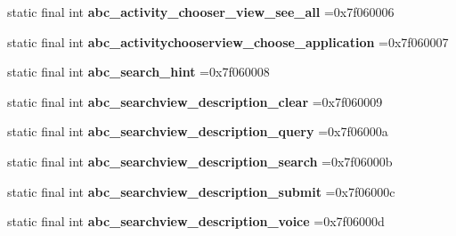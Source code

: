 \begin{DoxyCompactItemize}
\item 
\hypertarget{classcheck_1_1test_1_1_r_1_1string_a392b85ef23b31e97c14bfa4b84031797}{}static final int {\bfseries abc\+\_\+activity\+\_\+chooser\+\_\+view\+\_\+see\+\_\+all} =0x7f060006\label{classcheck_1_1test_1_1_r_1_1string_a392b85ef23b31e97c14bfa4b84031797}

\item 
\hypertarget{classcheck_1_1test_1_1_r_1_1string_a6532280df6ff470928259256084000d9}{}static final int {\bfseries abc\+\_\+activitychooserview\+\_\+choose\+\_\+application} =0x7f060007\label{classcheck_1_1test_1_1_r_1_1string_a6532280df6ff470928259256084000d9}

\item 
\hypertarget{classcheck_1_1test_1_1_r_1_1string_a2783cfe5ced23bd37469283b8fedf489}{}static final int {\bfseries abc\+\_\+search\+\_\+hint} =0x7f060008\label{classcheck_1_1test_1_1_r_1_1string_a2783cfe5ced23bd37469283b8fedf489}

\item 
\hypertarget{classcheck_1_1test_1_1_r_1_1string_ad0fbe4b6ffe3eda07d59655e137b35f9}{}static final int {\bfseries abc\+\_\+searchview\+\_\+description\+\_\+clear} =0x7f060009\label{classcheck_1_1test_1_1_r_1_1string_ad0fbe4b6ffe3eda07d59655e137b35f9}

\item 
\hypertarget{classcheck_1_1test_1_1_r_1_1string_a2135dfe78026bcfac02ae3b3fd41be39}{}static final int {\bfseries abc\+\_\+searchview\+\_\+description\+\_\+query} =0x7f06000a\label{classcheck_1_1test_1_1_r_1_1string_a2135dfe78026bcfac02ae3b3fd41be39}

\item 
\hypertarget{classcheck_1_1test_1_1_r_1_1string_a2f566ffd4b7b28037385fedf038e2405}{}static final int {\bfseries abc\+\_\+searchview\+\_\+description\+\_\+search} =0x7f06000b\label{classcheck_1_1test_1_1_r_1_1string_a2f566ffd4b7b28037385fedf038e2405}

\item 
\hypertarget{classcheck_1_1test_1_1_r_1_1string_ae25f5749325ebf1afe15b1944063f767}{}static final int {\bfseries abc\+\_\+searchview\+\_\+description\+\_\+submit} =0x7f06000c\label{classcheck_1_1test_1_1_r_1_1string_ae25f5749325ebf1afe15b1944063f767}

\item 
\hypertarget{classcheck_1_1test_1_1_r_1_1string_afbba2d75e0ca63582059faafe2a3416c}{}static final int {\bfseries abc\+\_\+searchview\+\_\+description\+\_\+voice} =0x7f06000d\label{classcheck_1_1test_1_1_r_1_1string_afbba2d75e0ca63582059faafe2a3416c}


\end{DoxyCompactItemize}
